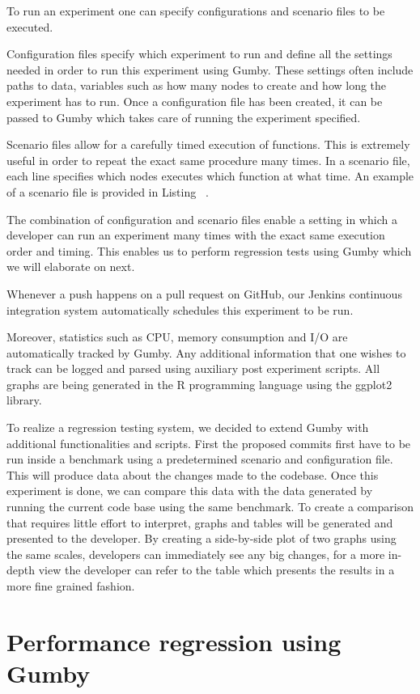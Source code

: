 To run an experiment one can specify configurations and scenario files to be executed.

Configuration files specify which experiment to run and define all the settings needed in order to run this experiment using Gumby.
These settings often include paths to data, variables such as how many nodes to create and how long the experiment has to run.
Once a configuration file has been created, it can be passed to Gumby which takes care of running the experiment specified.

Scenario files allow for a carefully timed execution of functions.
This is extremely useful in order to repeat the exact same procedure many times.
In a scenario file, each line specifies which nodes executes which function at what time.
An example of a scenario file is provided in Listing~ .

The combination of configuration and scenario files enable a setting in which a developer can run an experiment many times with the exact same execution order and timing.
This enables us to perform regression tests using Gumby which we will elaborate on next.

Whenever a push happens on a pull request on GitHub, our Jenkins continuous integration system automatically schedules this experiment to be run.

Moreover, statistics such as CPU, memory consumption and I/O are automatically tracked by Gumby.
Any additional information that one wishes to track can be logged and parsed using auxiliary post experiment scripts.
All graphs are being generated in the R programming language using the ggplot2 library.

To realize a regression testing system, we decided to extend Gumby with additional functionalities and scripts.
First the proposed commits first have to be run inside a benchmark using a predetermined scenario and configuration file.
This will produce data about the changes made to the codebase.
Once this experiment is done, we can compare this data with the data generated by running the current code base using the same benchmark.
To create a comparison that requires little effort to interpret, graphs and tables will be generated and presented to the developer.
By creating a side-by-side plot of two graphs using the same scales, developers can immediately see any big changes, for a more in-depth view the developer can refer to the table which presents the results in a more fine grained fashion.

\section{Performance regression using Gumby}


